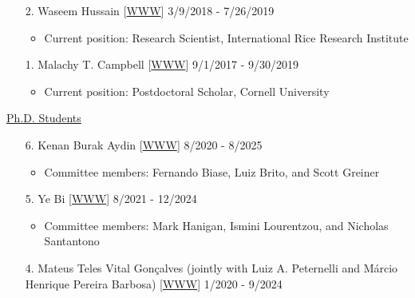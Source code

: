 \documentclass[margin,line,10pt]{res}
\begin{document}
\begin{resume}
\begin{enumerate}
  \vspace{0.3cm}
  
\item [2.] Waseem Hussain  [\textcolor{blue}{\href{https://whussain2.github.io/}{WWW}}]  \hfill 3/9/2018 - 7/26/2019
  \begin{itemize} 
  \item Current position: Research Scientist, International Rice Research Institute
  \end{itemize}
   
  \vspace{0.3cm}
  
\item [1.] Malachy T. Campbell  [\textcolor{blue}{\href{https://malachycampbell.github.io/}{WWW}}]  \hfill  9/1/2017 - 9/30/2019
  \begin{itemize} 
  \item Current position: Postdoctoral Scholar, Cornell University 
  \end{itemize}
\end{enumerate}



\begin{flushleft}
\hspace{0.2cm} \underline{Ph.D. Students}
\end{flushleft}
\begin{enumerate}


  \item [6.] Kenan Burak Aydin [\textcolor{blue}{\href{}{WWW}}]  \hfill  8/2020 - 8/2025

  \begin{itemize}
    \item  Committee members: Fernando Biase, Luiz Brito, and Scott Greiner
   \end{itemize}

  \vspace{0.3cm}

  \item [5.] Ye Bi [\textcolor{blue}{\href{https://yebigithub.github.io}{WWW}}]  \hfill  8/2021 - 12/2024

  \begin{itemize}
    \item  Committee members: Mark Hanigan, Ismini Lourentzou, and Nicholas Santantono 
   \end{itemize}

    \vspace{0.3cm}
    
    \item [4.] Mateus Teles Vital Gon\c calves (jointly with Luiz A. Peternelli and M\'{a}rcio Henrique Pereira Barbosa) [\textcolor{blue}{\href{https://goncalvesmateu.github.io/}{WWW}}]  \hfill  1/2020 - 9/2024 


\end{enumerate}
\end{resume}
\end{document}
